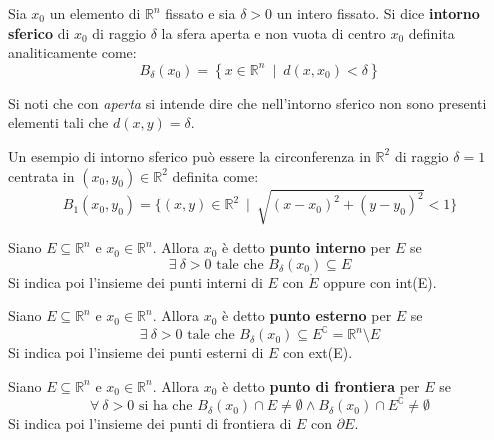 \begin{definition}
    Sia $x_0$ un elemento di $\mathbb{R}^n$ fissato e sia $\delta>0$ un intero fissato. Si dice \textbf{intorno sferico} di $x_0$ di raggio $\delta$ la sfera aperta e non vuota di centro $x_0$ definita analiticamente come:
    \begin{equation*}
        B_\delta(x_0)=\left\{x \in \mathbb{R}^n \ \mid \ d(x, x_0) < \delta \right\}
    \end{equation*}
    \end{definition}
    \begin{oss}
        Si noti che con \textit{aperta} si intende dire che nell'intorno sferico non sono presenti elementi tali che $d(x, y)=\delta$.
    \end{oss}
    \begin{example}
        Un esempio di intorno sferico può essere la circonferenza in $\mathbb{R}^2$ di raggio $\delta=1$ centrata in $(x_0, y_0) \in \mathbb{R}^2$ definita come:
        \begin{equation*}
            B_1(x_0, y_0)= \{(x,y) \in \mathbb{R}^2 \ \mid \ \sqrt{(x-x_0)^2+(y-y_0)^2}< 1\}
        \end{equation*}
    \end{example}
\begin{definition}
    Siano $E \subseteq \mathbb{R}^n$ e $x_0 \in \mathbb{R}^n$. Allora $x_0$ è detto \textbf{punto interno} per $E$ se 
    \begin{equation*}
        \exists\ \delta>0 \text{ tale che } B_\delta(x_0) \subseteq E 
    \end{equation*}
    Si indica poi l'insieme dei punti interni di $E$ con $\mathring{E}$ oppure con int(E).
\end{definition}
\begin{definition}
    Siano $E \subseteq \mathbb{R}^n$ e $x_0 \in \mathbb{R}^n$. Allora $x_0$ è detto \textbf{punto esterno} per $E$ se 
    \begin{equation*}
        \exists \ \delta>0 \text{ tale che } B_\delta(x_0) \subseteq E^\complement = \mathbb{R}^n \setminus E
    \end{equation*}
    Si indica poi l'insieme dei punti esterni di $E$ con ext(E).
\end{definition}
\begin{definition}
    Siano $E \subseteq \mathbb{R}^n$ e $x_0 \in \mathbb{R}^n$. Allora $x_0$ è detto \textbf{punto di frontiera} per $E$ se 
    \begin{equation*}
        \forall \ \delta>0 \text{ si ha che } B_\delta(x_0) \cap E \neq \emptyset \land B_\delta(x_0) \cap E^\complement \neq \emptyset 
    \end{equation*}
    Si indica poi l'insieme dei punti di frontiera di $E$ con $\partial{E}$.
\end{definition}
